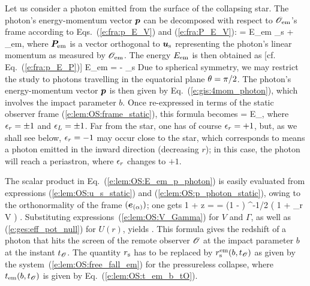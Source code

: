Let us consider a photon emitted from the surface of the collapsing star.
The photon's energy-momentum vector $\bm{p}$ can be decomposed with respect to $\mathscr{O}_{\rm em}$'s
frame according to Eqs.~(\ref{e:fra:p_E_V}) and (\ref{e:fra:P_E_V}):
\be \label{e:lem:OS:p_photon_Oem}
     = E_{\rm em} _{\rm s} + _{\rm em},
\ee
where $\bm{P}_{\rm em}$ is a vector orthogonal to $\bm{u}_{\rm s}$ representing
the photon's linear momentum as measured by $\mathscr{O}_{\rm em}$.
The energy $E_{\rm em}$ is then obtained as [cf. Eq.~(\ref{e:fra:p_E_P})]
\be \label{e:lem:OS:E_em_p_photon}
    E_{\rm em} = - _{\rm s} \cdot {}
\ee
Due to spherical symmetry, we may restrict the study to photons travelling
in the equatorial plane $\theta=\pi/2$.  The photon's energy-momentum vector $\bm{p}$
is then given by Eq.~(\ref{e:gis:4mom_photon}), which involves
the impact parameter $b$. Once re-expressed
in terms of the static observer frame (\ref{e:lem:OS:frame_static}), this
formula becomes
\be \label{e:lem:OS:p_photon_static}
     = E_\infty {} ,
\ee
where $\epsilon_r = \pm 1$ and $\epsilon_L = \pm 1$.
Far from  the star, one has of course $\epsilon_r = +1$, but, as we shall see below,
$\epsilon_r = -1$ may occur close to the star, which corresponds to means a photon
emitted in the inward direction (decreasing $r$); in this case, the photon
will reach a periastron, where $\epsilon_r$ changes to $+1$.

The scalar product in Eq.~(\ref{e:lem:OS:E_em_p_photon}) is easily
evaluated from expressions (\ref{e:lem:OS:u_s_static}) and
(\ref{e:lem:OS:p_photon_static}),
owing to the orthonormality of the frame $(\bm{e}_{(\alpha)})$; one gets
\be \label{e:lem:OS:redshift_gal}
    1 + z = 
    = \Gamma \left(1 -  \right) ^{-1/2}
    \left( 1  + \eps_r V  \right) .
\ee
Substituting expressions~(\ref{e:lem:OS:V_Gamma}) for $V$
and $\Gamma$, as well as (\ref{e:ges:eff_pot_null}) for $U(r)$, yields
\be \label{e:lem:OS:redshift_pless}
     .
\ee
This formula gives the redshift of a photon that hits the screen of the
remote observer $\mathscr{O}$ at the impact parameter $b$ at the instant $t_{\mathscr{O}}$.
The quantity $r_{\rm s}$ has to be replaced by $r_{\rm s}^{\rm em}(b,t_{\mathscr{O}})$
as given by the system~(\ref{e:lem:OS:free_fall_em}) for the pressureless collapse,
where $t_{\rm em}(b,t_{\mathscr{O}})$ is given by Eq.~(\ref{e:lem:OS:t_em_b_tO}).

